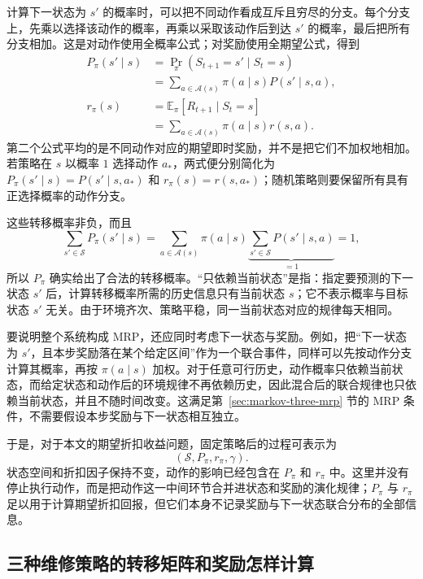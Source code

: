 \documentclass[UTF8]{ctexart}
\begin{document}
计算下一状态为 $s'$ 的概率时，可以把不同动作看成互斥且穷尽的分支。每个分支上，先乘以选择该动作的概率，再乘以采取该动作后到达 $s'$ 的概率，最后把所有分支相加。这是对动作使用全概率公式；对奖励使用全期望公式，得到
\begin{equation}
  \begin{aligned}
    P_\pi(s'\mid s)
      &=\Pr_\pi(S_{t+1}=s'\mid S_t=s)\\
      &=\sum_{a\in\mathcal A(s)}\pi(a\mid s)P(s'\mid s,a),\\
    r_\pi(s)
      &=\mathbb E_\pi[R_{t+1}\mid S_t=s]\\
      &=\sum_{a\in\mathcal A(s)}\pi(a\mid s)r(s,a).
  \end{aligned}
  \label{eq:markov-three-induced}
\end{equation}
第二个公式平均的是不同动作对应的期望即时奖励，并不是把它们不加权地相加。若策略在 $s$ 以概率 $1$ 选择动作 $a_*$，两式便分别简化为 $P_\pi(s'\mid s)=P(s'\mid s,a_*)$ 和 $r_\pi(s)=r(s,a_*)$；随机策略则要保留所有具有正选择概率的动作分支。

这些转移概率非负，而且
\[
  \sum_{s'\in\mathcal S}P_\pi(s'\mid s)
  =\sum_{a\in\mathcal A(s)}\pi(a\mid s)
    \underbrace{\sum_{s'\in\mathcal S}P(s'\mid s,a)}_{=1}
  =1,
\]
所以 $P_\pi$ 确实给出了合法的转移概率。“只依赖当前状态”是指：指定要预测的下一状态 $s'$ 后，计算转移概率所需的历史信息只有当前状态 $s$；它不表示概率与目标状态 $s'$ 无关。由于环境齐次、策略平稳，同一当前状态对应的规律每天相同。

要说明整个系统构成 MRP，还应同时考虑下一状态与奖励。例如，把“下一状态为 $s'$，且本步奖励落在某个给定区间”作为一个联合事件，同样可以先按动作分支计算其概率，再按 $\pi(a\mid s)$ 加权。对于任意可行历史，动作概率只依赖当前状态，而给定状态和动作后的环境规律不再依赖历史，因此混合后的联合规律也只依赖当前状态，并且不随时间改变。这满足第~\ref{sec:markov-three-mrp} 节的 MRP 条件，不需要假设本步奖励与下一状态相互独立。

于是，对于本文的期望折扣收益问题，固定策略后的过程可表示为
\[
  (\mathcal S,P_\pi,r_\pi,\gamma).
\]
状态空间和折扣因子保持不变，动作的影响已经包含在 $P_\pi$ 和 $r_\pi$ 中。这里并没有停止执行动作，而是把动作这一中间环节合并进状态和奖励的演化规律；$P_\pi$ 与 $r_\pi$ 足以用于计算期望折扣回报，但它们本身不记录奖励与下一状态联合分布的全部信息。

\subsection{三种维修策略的转移矩阵和奖励怎样计算}
\end{document}
